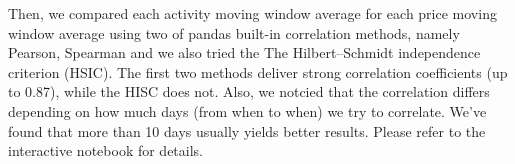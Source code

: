 

Then, we compared each activity moving window average for each price moving window average using two of pandas built-in correlation methods, namely Pearson, Spearman and we also tried the The Hilbert–Schmidt independence criterion (HSIC). The first two methods deliver strong correlation coefficients (up to 0.87), while the HISC does not. Also, we notcied that the correlation differs depending on how much days (from when to when) we try to correlate. We've found that more than 10 days usually yields better results. Please refer to the interactive notebook for details.




